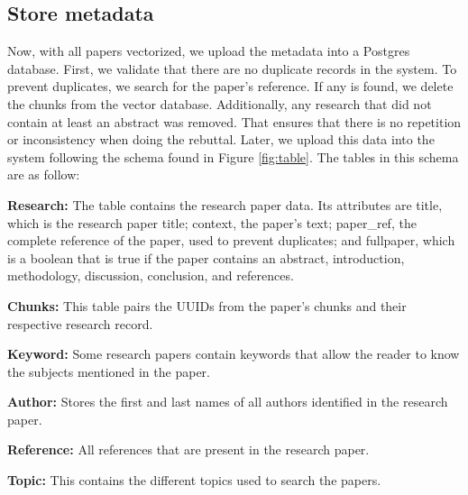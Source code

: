 \subsection{Store metadata}
Now, with all papers vectorized, we upload the metadata into a Postgres database. First, we validate that there are no duplicate records in the system. To prevent duplicates, we search for the paper's reference. If any is found, we delete the chunks from the vector database. Additionally, any research that did not contain at least an abstract was removed. That ensures that there is no repetition or inconsistency when doing the rebuttal. Later, we upload this data into the system following the schema found in Figure \ref{fig:table}. The tables in this schema are as follow:

\begin{description}
	\item{\textbf{Research:}}  The table contains the research paper data. Its attributes are title, which is the research paper title; context, the paper’s text; paper\_ref, the complete reference of the paper, used to prevent duplicates; and fullpaper, which is a boolean that is true if the paper contains an abstract, introduction, methodology, discussion, conclusion, and references.
	\item{\textbf{Chunks:}} This table pairs the UUIDs from the paper's chunks and their respective research record.  
	\item{\textbf{Keyword:}} Some research papers contain keywords that allow the reader to know the subjects mentioned in the paper. 
	\item{\textbf{Author:}} Stores the first and last names of all authors identified in the research paper. 
	\item{\textbf{Reference:}} All references that are present in the research paper.
	\item{\textbf{Topic:}} This contains the different topics used to search the papers.

\end{description}

